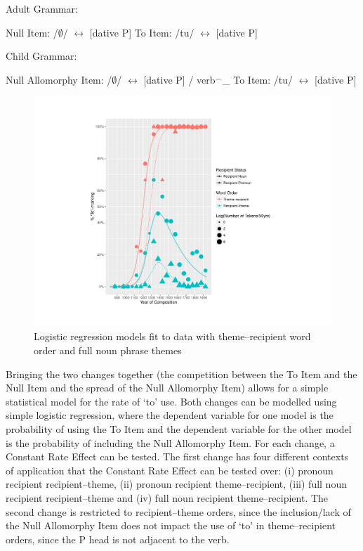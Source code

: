 	\begin{exe}
		\ex Adult Grammar:\label{ex:adult-grammar}
		\begin{xlist}
			\ex Null Item:  /$\emptyset$/ $\leftrightarrow$ [dative P]
			\ex To Item: /tu/ $\leftrightarrow$ [dative P]
		\end{xlist}
		\ex Child Grammar:\label{ex:child-grammar}
		\begin{xlist}
			\ex Null Allomorphy Item: /$\emptyset$/ $\leftrightarrow$ [dative P] / verb$^{\smallfrown}$\_
			\ex To Item: /tu/ $\leftrightarrow$ [dative P]
		\end{xlist}
	\end{exe}

	\begin{figure}[ht!]
		\includegraphics[width=\linewidth]{../images/brit-tn}
		\caption{Logistic regression models fit to data with theme--recipient word order and full noun phrase themes}
		\label{fig:to-use}
	\end{figure}

	Bringing the two changes together (the competition between the To Item and the Null Item and the spread of the Null Allomorphy Item) allows for a simple statistical model for the rate of `to' use. Both changes can be modelled using simple logistic regression, where the dependent variable for one model is the probability of using the To Item and the dependent variable for the other model is the probability of including the Null Allomorphy Item. For each change, a Constant Rate Effect can be tested. The first change has four different contexts of application that the Constant Rate Effect can be tested over: (i) pronoun recipient recipient--theme, (ii) pronoun recipient theme--recipient, (iii) full noun recipient recipient--theme and (iv) full noun recipient theme--recipient. The second change is restricted to recipient--theme orders, since the inclusion/lack of the Null Allomorphy Item does not impact the use of `to' in theme--recipient orders, since the P head is not adjacent to the verb. 

